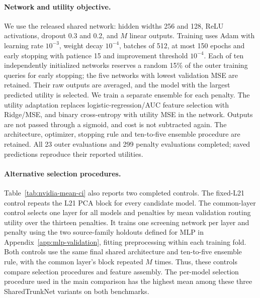 \paragraph{Network and utility objective.}
We use the released shared network: hidden widths 256 and 128, ReLU activations, dropout 0.3 and 0.2, and $M$ linear outputs.
Training uses Adam with learning rate $10^{-3}$, weight decay $10^{-4}$, batches of 512, at most 150 epochs and early stopping with patience 15 and improvement threshold $10^{-4}$.
Each of ten independently initialized networks reserves a random 15\% of the outer training queries for early stopping; the five networks with lowest validation MSE are retained.
Their raw outputs are averaged, and the model with the largest predicted utility is selected.
We train a separate ensemble for each penalty.
The utility adaptation replaces logistic-regression/AUC feature selection with Ridge/MSE, and binary cross-entropy with utility MSE in the network.
Outputs are not passed through a sigmoid, and cost is not subtracted again.
The architecture, optimizer, stopping rule and ten-to-five ensemble procedure are retained.
All 23 outer evaluations and 299 penalty evaluations completed; saved predictions reproduce their reported utilities.

\paragraph{Alternative selection procedures.}
Table~\ref{tab:nvidia-mean-ci} also reports two completed controls.
The fixed-L21 control repeats the L21 PCA block for every candidate model.
The common-layer control selects one layer for all models and penalties by mean validation routing utility over the thirteen penalties.
It trains one screening network per layer and penalty using the two source-family holdouts defined for MLP in Appendix~\ref{app:mlp-validation}, fitting preprocessing within each training fold.
Both controls use the same final shared architecture and ten-to-five ensemble rule, with the common layer's block repeated $M$ times.
Thus, these controls compare selection procedures and feature assembly.
The per-model selection procedure used in the main comparison has the highest mean among these three SharedTrunkNet variants on both benchmarks.

